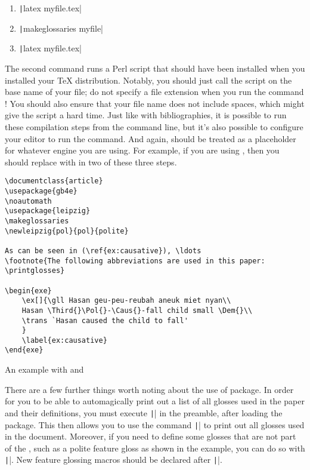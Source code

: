 \begin{enumerate}[label={(\roman*)}]

	\item{\texttt|latex myfile.tex|}

	\item{\texttt|makeglossaries myfile|}

	\item{\texttt|latex myfile.tex|}

\end{enumerate}

The second command runs a Perl script that should have been installed when you installed your TeX distribution.
Notably, you should just call the script on the base name of your file; do not specify a file extension when you run the command !
You should also ensure that your file name does not include spaces, which might give the  script a hard time.
Just like with bibliographies, it is possible to run these compilation steps from the command line, but it's also possible to configure your editor to run the  command.
And again,  should be treated as a placeholder for whatever engine you are using.
For example, if you are using , then you should replace  with  in two of these three steps.

\begin{listing}[htbp]
	\centering
	\begin{verbatim}
\documentclass{article}
\usepackage{gb4e}
\noautomath
\usepackage{leipzig}
\makeglossaries
\newleipzig{pol}{pol}{polite}

As can be seen in (\ref{ex:causative}), \ldots
\footnote{The following abbreviations are used in this paper: \printglosses} 

\begin{exe}
    \ex[]{\gll Hasan geu-peu-reubah aneuk miet nyan\\
    Hasan \Third{}\Pol{}-\Caus{}-fall child small \Dem{}\\
    \trans `Hasan caused the child to fall'
    }
    \label{ex:causative}
\end{exe}

	\end{verbatim}
	\caption{An example with  and }
	\label{lst:leipzig-example}
\end{listing}

There are a few further things worth noting about the use of  package.
In order for you to be able to automagically print out a list of all glosses used in the paper and their definitions, you must execute \texttt|\makeglossaries| in the preamble, after loading the  package.
This then allows you to use the command \texttt|\printglosses| to print out all glosses used in the document.
Moreover, if you need to define some glosses that are not part of the \LGR, such as a polite feature gloss as shown in the example, you can do so with \texttt|\newleipzig|.
New feature glossing macros should be declared after \texttt|\makeglossaries|.

